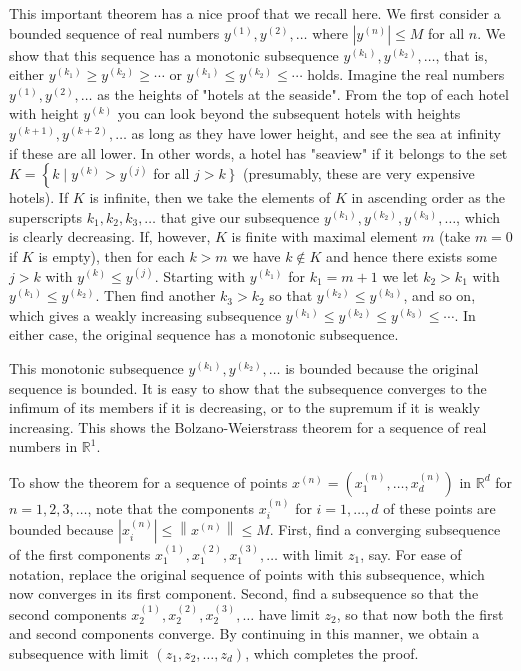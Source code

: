 \documentclass[12pt]{article}
\begin{document}
This important theorem has a nice proof that we recall here. We first consider a bounded sequence of real numbers $y^{(1)}, y^{(2)}, \ldots$ where $\left|y^{(n)}\right| \leq M$ for all $n$. We show that this sequence has a monotonic subsequence $y^{\left(k_{1}\right)}, y^{\left(k_{2}\right)}, \ldots$, that is, either $y^{\left(k_{1}\right)} \geq y^{\left(k_{2}\right)} \geq \cdots$ or $y^{\left(k_{1}\right)} \leq y^{\left(k_{2}\right)} \leq \cdots$ holds. Imagine the real numbers $y^{(1)}, y^{(2)}, \ldots$ as the heights of "hotels at the seaside". From the top of each hotel with height $y^{(k)}$ you can look beyond the subsequent hotels with heights $y^{(k+1)}, y^{(k+2)}, \ldots$ as long as they have lower height, and see the sea at infinity if these are all lower. In other words, a hotel has "seaview" if it belongs to the set $K=\left\{k \mid y^{(k)}>y^{(j)}\right.$ for all $\left.j>k\right\}$ (presumably, these are very expensive hotels). If $K$ is infinite, then we take the elements of $K$ in ascending order as the superscripts $k_{1}, k_{2}, k_{3}, \ldots$ that give our subsequence $y^{\left(k_{1}\right)}, y^{\left(k_{2}\right)}, y^{\left(k_{3}\right)}, \ldots$, which is clearly decreasing. If, however, $K$ is finite with maximal element $m$ (take $m=0$ if $K$ is empty), then for each $k>m$ we have $k \notin K$ and hence there exists some $j>k$ with $y^{(k)} \leq y^{(j)}$. Starting with $y^{\left(k_{1}\right)}$ for $k_{1}=m+1$ we let $k_{2}>k_{1}$ with $y^{\left(k_{1}\right)} \leq y^{\left(k_{2}\right)}$. Then find another $k_{3}>k_{2}$ so that $y^{\left(k_{2}\right)} \leq y^{\left(k_{3}\right)}$, and so on, which gives a weakly increasing subsequence $y^{\left(k_{1}\right)} \leq y^{\left(k_{2}\right)} \leq y^{\left(k_{3}\right)} \leq \cdots$. In either case, the original sequence has a monotonic subsequence.

This monotonic subsequence $y^{\left(k_{1}\right)}, y^{\left(k_{2}\right)}, \ldots$ is bounded because the original sequence is bounded. It is easy to show that the subsequence converges to the infimum of its members if it is decreasing, or to the supremum if it is weakly increasing. This shows the Bolzano-Weierstrass theorem for a sequence of real numbers in $\mathbb{R}^{1}$.

To show the theorem for a sequence of points $x^{(n)}=\left(x_{1}^{(n)}, \ldots, x_{d}^{(n)}\right)$ in $\mathbb{R}^{d}$ for $n=1,2,3, \ldots$, note that the components $x_{i}^{(n)}$ for $i=1, \ldots, d$ of these points are bounded because $\left|x_{i}^{(n)}\right| \leq\left\|x^{(n)}\right\| \leq M$. First, find a converging subsequence of the first components $x_{1}^{(1)}, x_{1}^{(2)}, x_{1}^{(3)}, \ldots$ with limit $z_{1}$, say. For ease of notation, replace the original sequence of points with this subsequence, which now converges in its first component. Second, find a subsequence so that the second components $x_{2}^{(1)}, x_{2}^{(2)}, x_{2}^{(3)}, \ldots$ have limit $z_{2}$, so that now both the first and second components converge. By continuing in this manner, we obtain a subsequence with limit $\left(z_{1}, z_{2}, \ldots, z_{d}\right)$, which completes the proof.
\end{document}
